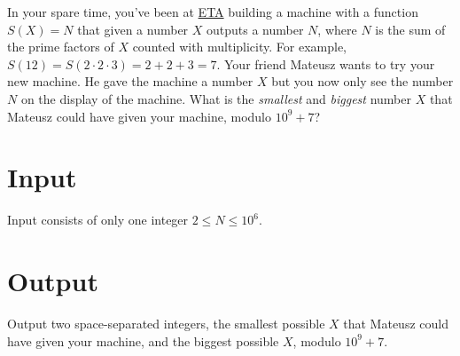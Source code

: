 
In your spare time, you've been at \href{https://eta.chalmers.se/}{ETA} building a machine with a
function $S(X) = N$ that given a number $X$ outputs a number $N$, where $N$ is the sum of the prime
factors of $X$ counted with multiplicity. For example, $S(12) = S(2 \cdot 2 \cdot 3) = 2 + 2 + 3 =
7$. Your friend Mateusz wants to try your new machine. He gave the machine a number $X$ but you now
only see the number $N$ on the display of the machine. What is the \textit{smallest} and
\textit{biggest} number $X$ that Mateusz could have given your machine, modulo $10^9 + 7$?

\section*{Input}
Input consists of only one integer $2 \le N \le 10^6$.

\section*{Output}
Output two space-separated integers, the smallest possible $X$ that Mateusz could have given your
machine, and the biggest possible $X$, modulo $10^9 + 7$.
